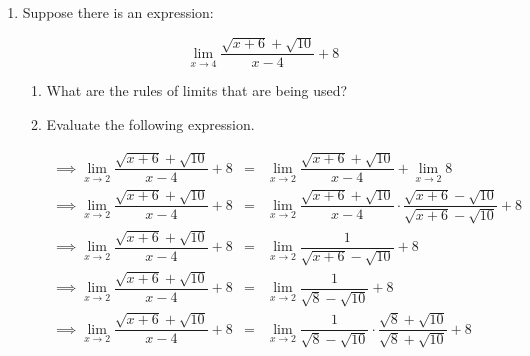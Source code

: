 \documentclass[10pt,paper=letter]{scrartcl}
\begin{document}
\begin{enumerate}[resume, label=\arabic*.,font=\bfseries]
    \item Suppose there is an expression:
    
    $$\lim_{x \rightarrow 4} \dfrac{\sqrt{x+6}+\sqrt{10}}{x-4} + 8$$
    
    \begin{enumerate}
        \item[(a)] What are the rules of limits that are being used? 
        
        
         
          
        \item[(b)] Evaluate the following expression.
        
        
        \sol         
        \begin{equation*}
            \begin{array}{lll}
               \implies \displaystyle \mathop {\lim }\limits_{x \rightarrow 2} \dfrac{\sqrt{x+6}+\sqrt{10}}{x-4} + 8 & =  &   \displaystyle \mathop {\lim }\limits_{x \rightarrow 2}  \dfrac{\sqrt{x+6}+\sqrt{10}}{x-4} + \displaystyle \mathop {\lim }\limits_{x \rightarrow 2} 8\\
                
              
                
             \implies \displaystyle \mathop {\lim }\limits_{x \rightarrow 2} \dfrac{\sqrt{x+6}+\sqrt{10}}{x-4} + 8 & =  &   \displaystyle \mathop {\lim }\limits_{x \rightarrow 2}  \dfrac{\sqrt{x+6}+\sqrt{10}}{x-4} \cdot \dfrac{\sqrt{x+6}-\sqrt{10}}{\sqrt{x+6}-\sqrt{10}}+ 8\\
             
             
               \implies \displaystyle \mathop {\lim }\limits_{x \rightarrow 2} \dfrac{\sqrt{x+6}+\sqrt{10}}{x-4} + 8 & =  &   \displaystyle \mathop {\lim }\limits_{x \rightarrow 2} \dfrac{1}{\sqrt{x+6}-\sqrt{10}}+ 8\\
               
                 \implies \displaystyle \mathop {\lim }\limits_{x \rightarrow 2} \dfrac{\sqrt{x+6}+\sqrt{10}}{x-4} + 8 & =  &   \displaystyle \mathop {\lim }\limits_{x \rightarrow 2} \dfrac{1}{\sqrt{8}-\sqrt{10}}+ 8\\
                 
                    \implies \displaystyle \mathop {\lim }\limits_{x \rightarrow 2} \dfrac{\sqrt{x+6}+\sqrt{10}}{x-4} + 8 & =  &   \displaystyle \mathop {\lim }\limits_{x \rightarrow 2} \dfrac{1}{\sqrt{8}-\sqrt{10}} \cdot \dfrac{\sqrt{8}+\sqrt{10}}{\sqrt{8}+\sqrt{10}}+ 8\\
                    

\end{array}
\end{equation*}
\end{enumerate}
\end{enumerate}
\end{document}
